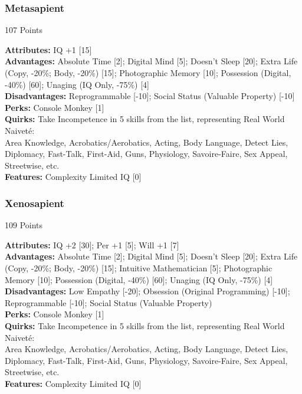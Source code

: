 \begin{multicols*}{3}
	\subsubsection*{Metasapient}
	\begin{flushright}
		107 Points
	\end{flushright}
	\textbf{Attributes:} 
	IQ +1 [15]
	\\\textbf{Advantages:} 
	Absolute Time [2]; Digital Mind [5]; Doesn't Sleep [20]; Extra Life (Copy, -20\%; Body, -20\%) [15]; Photographic Memory [10]; Possession (Digital, -40\%) [60]; Unaging (IQ Only, -75\%) [4]
	\\\textbf{Disadvantages:} 
	Reprogrammable [-10]; Social Status (Valuable Property) [-10]
	\\\textbf{Perks:}
	Console Monkey [1]
	\\\textbf{Quirks:}
	Take Incompetence in 5 skills from the list, representing Real World Naiveté:\\
	Area Knowledge, Acrobatics/Aerobatics, Acting, Body Language, Detect Lies, Diplomacy, Fast-Talk, First-Aid, Guns, Physiology,  Savoire-Faire, Sex Appeal, Streetwise, etc.
	\\\textbf{Features:}
	Complexity Limited IQ [0]
	
	\subsubsection*{Xenosapient}
	\begin{flushright}
		109 Points
	\end{flushright}
	\textbf{Attributes:} 
	IQ +2 [30]; Per +1 [5]; Will +1 [7]
	\\\textbf{Advantages:} 
	Absolute Time [2]; Digital Mind [5]; Doesn't Sleep [20]; Extra Life (Copy, -20\%; Body, -20\%) [15]; Intuitive Mathematician [5]; Photographic Memory [10]; Possession (Digital, -40\%) [60]; Unaging (IQ Only, -75\%) [4]
	\\\textbf{Disadvantages:} 
	Low Empathy [-20]; Obsession (Original Programming) [-10]; Reprogrammable [-10]; Social Status (Valuable Property) 
	\\\textbf{Perks:}
	Console Monkey [1]
	\\\textbf{Quirks:}
	Take Incompetence in 5 skills from the list, representing Real World Naiveté:\\
	Area Knowledge, Acrobatics/Aerobatics, Acting, Body Language, Detect Lies, Diplomacy, Fast-Talk, First-Aid, Guns, Physiology,  Savoire-Faire, Sex Appeal, Streetwise, etc.
	\\\textbf{Features:}
	Complexity Limited IQ [0]
	

\end{multicols*}
